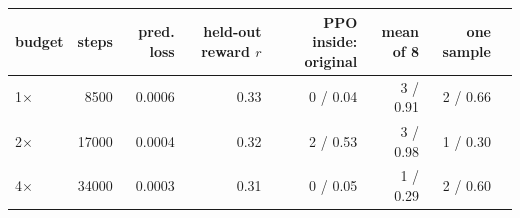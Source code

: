\begin{tabular}{lrrrrrrr}
\toprule
budget & steps & pred. loss & held-out reward $r$ & PPO inside: original & mean of 8 & one sample \\
\midrule
1$\times$ & 8500 & 0.0006 & 0.33 & 0 / 0.04 & 3 / 0.91 & 2 / 0.66 \\
2$\times$ & 17000 & 0.0004 & 0.32 & 2 / 0.53 & 3 / 0.98 & 1 / 0.30 \\
4$\times$ & 34000 & 0.0003 & 0.31 & 0 / 0.05 & 1 / 0.29 & 2 / 0.60 \\
\bottomrule
\end{tabular}
